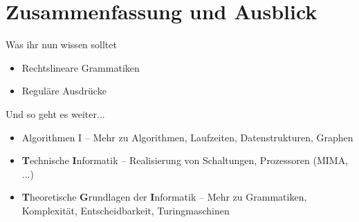\def\abbrsize{\footnotesize}

\appendix
\beginbackup

\section{Zusammenfassung und Ausblick}

\begin{frame}
	\begin{block}{Was ihr nun wissen solltet}
		\begin{itemize}
			\item Rechtslineare Grammatiken
			\item Reguläre Ausdrücke
		\end{itemize}
	\end{block}
	
	\begin{block}{Und so geht es weiter...}
		\vspace{-.3\baselineskip}
		\begin{itemize}
			\item Algorithmen I -- Mehr zu Algorithmen, Laufzeiten, Datenstrukturen, Graphen
			\item \textbf{T}{\abbrsize echnische} \textbf{I}{\abbrsize nformatik} -- Realisierung von Schaltungen, Prozessoren (MIMA, ...)
			\item \textbf{T}{\abbrsize heoretische} \textbf{G}{\abbrsize rundlagen der} \textbf{I}{\abbrsize nformatik} -- Mehr zu Grammatiken, Komplexität, Entscheidbarkeit, Turingmaschinen
		\end{itemize}
	\end{block}
\end{frame}



